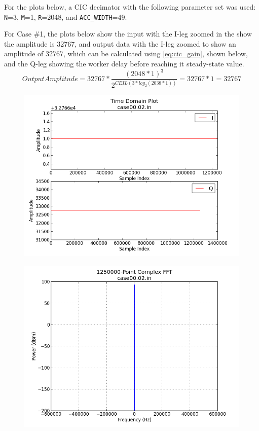 \documentclass{article}
\begin{document}
For the plots below, a CIC decimator with the following parameter set was used: \verb+N+=3, \verb+M+=1, \verb+R+=2048, and \verb+ACC_WIDTH+=49.\bigskip

\newpage
	For Case \#1, the plots below show the input with the I-leg zoomed in the show the amplitude is 32767, and output data with the I-leg zoomed to show an amplitude of 32767, which can be calculated using \ref{eq:cic_gain}, shown below, and the Q-leg showing the worker delay before reaching it steady-state value.
		  \begin{equation} \label{eq:cic_gain_applied}
	      	Output Amplitude = 32767*\frac{(2048*1)^3}{2^{CEIL(3*log_2(2038*1))}} = 32767*1=32767
	      \end{equation}

	\begin{figure}[ht]
		\centering
		\begin{minipage}{.5\textwidth}
			\centering\includegraphics[width=1.0\linewidth]{input_time_DC}
			\label{fig:input_time_DC}
		\end{minipage}%
		\begin{minipage}{.5\textwidth}
			\centering\includegraphics[width=1.0\linewidth]{input_freq_DC}
			\label{fig:input_freq_DC}
		\end{minipage}
	\end{figure}
\end{document}
